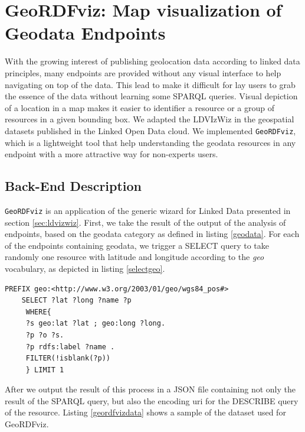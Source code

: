 \section{GeoRDFviz: Map visualization of Geodata Endpoints}
\label{sec:geordfviz}

With the growing interest of publishing geolocation data according to linked data principles, many endpoints are provided without any visual interface to help navigating on top of the data. This lead to make it difficult for lay users to grab the essence of the data without learning some SPARQL queries. Visual depiction of a location in a map makes it easier to identifier a resource or a group of resources in a given bounding box. We adapted the LDVIzWiz in the geospatial datasets published in the Linked Open Data cloud. We implemented \texttt{GeoRDFviz}, which is a lightweight tool that help understanding the geodata resources in any endpoint with a more attractive way for non-experts users.

\subsection{Back-End Description}


\texttt{GeoRDFviz} is an application of the generic wizard for Linked Data presented in section \ref{sec:ldvizwiz}. First, we take the result of the output of the analysis of endpoints, based on the geodata category as defined in listing \ref{geodata}. For each of the endpoints containing geodata, we trigger a SELECT query to take randomly one resource with latitude and longitude according to the \textit{geo} vocabulary, as depicted in listing \ref{selectgeo}.

\begin{lstlisting}
PREFIX geo:<http://www.w3.org/2003/01/geo/wgs84_pos#>
	SELECT ?lat ?long ?name ?p
	 WHERE{
	 ?s geo:lat ?lat ; geo:long ?long.
	 ?p ?o ?s.
	 ?p rdfs:label ?name . 		
	 FILTER(!isblank(?p))
	 } LIMIT 1

\end{lstlisting}

After we output the result of this process in a JSON file containing not only the result of the SPARQL query, but also the encoding uri for the DESCRIBE query of the resource. 	Listing \ref{geordfvizdata} shows a sample of the dataset used for GeoRDFviz.

